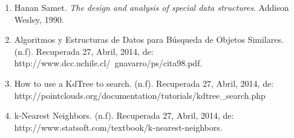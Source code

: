 \documentclass[letterpaper]{article}
\begin{document}
\begin{enumerate}
\item Hanan Samet. \textit{The design and analysis of special data structures}. Addison Wesley, 1990.
\item Algoritmos y Estructuras de Datos para Búsqueda de Objetos Similares. (n.f). Recuperada 27, Abril, 2014, de:\\ http://www.dcc.uchile.cl/~gnavarro/ps/cita98.pdf.\\
\item How to use a KdTree to search. (n.f). Recuperada 27, Abril, 2014, de:\\
http://pointclouds.org/documentation/tutorials/kdtree\_search.php \\
\item k-Nearest Neighbors. (n.f). Recuperada 27, Abril, 2014, de:\\
http://www.statsoft.com/textbook/k-nearest-neighbors.\\
\end{enumerate}
	
\end{document}
